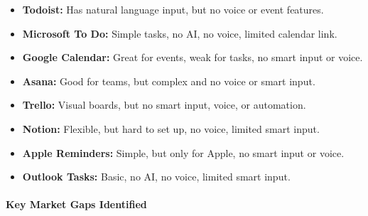 \documentclass[12pt,a4paper]{article}
\begin{document}
\begin{itemize}
    \item \textbf{Todoist:} Has natural language input, but no voice or event features.
    \item \textbf{Microsoft To Do:} Simple tasks, no AI, no voice, limited calendar link.
    \item \textbf{Google Calendar:} Great for events, weak for tasks, no smart input or voice.
    \item \textbf{Asana:} Good for teams, but complex and no voice or smart input.
    \item \textbf{Trello:} Visual boards, but no smart input, voice, or automation.
    \item \textbf{Notion:} Flexible, but hard to set up, no voice, limited smart input.
    \item \textbf{Apple Reminders:} Simple, but only for Apple, no smart input or voice.
    \item \textbf{Outlook Tasks:} Basic, no AI, no voice, limited smart input.
\end{itemize}

\paragraph{Key Market Gaps Identified}

\begin{table}[H]
\centering
{}
\caption{Market Gap Analysis: Current Solutions vs. Plan Genie AI}
\end{table}
\end{document}
